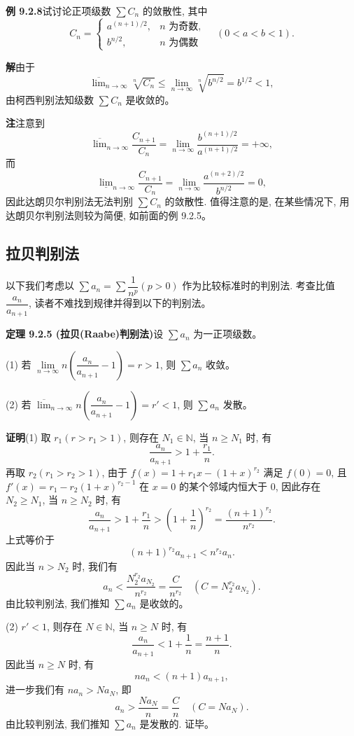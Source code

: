 \documentclass[UTF8, 12pt, fontset=fandol, oneside]{ctexart}
\begin{document}
\noindent\textbf{例 9.2.8}\quad 试讨论正项级数 $\sum C_n$ 的敛散性, 其中
\[
  C_n=\begin{cases}
    a^{(n+1)/2}, & n\text{ 为奇数},\\
    b^{n/2}, & n\text{ 为偶数}
  \end{cases}\quad(0<a<b<1).
\]

\noindent\textbf{解}\quad 由于
\[
  \overline{\lim}_{n\to\infty}\sqrt[n]{C_n}\leq\lim_{n\to\infty}\sqrt[n]{b^{n/2}}=b^{1/2}<1,
\]
由柯西判别法知级数 $\sum C_n$ 是收敛的。

\noindent\textbf{注}\quad 注意到
\[
  \overline{\lim}_{n\to\infty}\frac{C_{n+1}}{C_n}
  =\lim_{n\to\infty}\frac{b^{(n+1)/2}}{a^{(n+1)/2}}=+\infty,
\]
而
\[
  \underline{\lim}_{n\to\infty}\frac{C_{n+1}}{C_n}
  =\lim_{n\to\infty}\frac{a^{(n+2)/2}}{b^{n/2}}=0,
\]
因此达朗贝尔判别法无法判别 $\sum C_n$ 的敛散性. 值得注意的是, 在某些情况下, 用达朗贝尔判别法则较为简便, 如前面的例 9.2.5。

\subsection{拉贝判别法}

以下我们考虑以 $\sum a_n=\sum\dfrac1{n^p}(p>0)$ 作为比较标准时的判别法. 考查比值 $\dfrac{a_n}{a_{n+1}}$, 读者不难找到规律并得到以下的判别法。

\noindent\textbf{定理 9.2.5 (拉贝(Raabe)判别法)}\quad 设 $\sum a_n$ 为一正项级数。

(1) 若 $\lim\limits_{n\to\infty}n\left(\dfrac{a_n}{a_{n+1}}-1\right)=r>1$, 则 $\sum a_n$ 收敛。

(2) 若 $\overline{\lim}_{n\to\infty}n\left(\dfrac{a_n}{a_{n+1}}-1\right)=r'<1$, 则 $\sum a_n$ 发散。

\noindent\textbf{证明}\quad (1) 取 $r_1(r>r_1>1)$, 则存在 $N_1\in\mathbb{N}$, 当 $n\geq N_1$ 时, 有
\[
  \frac{a_n}{a_{n+1}}>1+\frac{r_1}{n}.
\]
再取 $r_2(r_1>r_2>1)$, 由于 $f(x)=1+r_1x-(1+x)^{r_2}$ 满足 $f(0)=0$, 且 $f'(x)=r_1-r_2(1+x)^{r_2-1}$ 在 $x=0$ 的某个邻域内恒大于 0, 因此存在 $N_2\geq N_1$, 当 $n\geq N_2$ 时, 有
\[
  \frac{a_n}{a_{n+1}}>1+\frac{r_1}{n}>\left(1+\frac1n\right)^{r_2}
  =\frac{(n+1)^{r_2}}{n^{r_2}}.
\]
上式等价于
\[
  (n+1)^{r_2}a_{n+1}<n^{r_2}a_n.
\]
因此当 $n>N_2$ 时, 我们有
\[
  a_n<\frac{N_2^{r_2}a_{N_2}}{n^{r_2}}=\frac{C}{n^{r_2}}\quad(C=N_2^{r_2}a_{N_2}).
\]
由比较判别法, 我们推知 $\sum a_n$ 是收敛的。

(2) $r'<1$, 则存在 $N\in\mathbb{N}$, 当 $n\geq N$ 时, 有
\[
  \frac{a_n}{a_{n+1}}<1+\frac1n=\frac{n+1}{n}.
\]
因此当 $n\geq N$ 时, 有
\[
  na_n<(n+1)a_{n+1},
\]
进一步我们有 $na_n>Na_N$, 即
\[
  a_n>\frac{Na_N}{n}=\frac{C}{n}\quad(C=Na_N).
\]
由比较判别法, 我们推知 $\sum a_n$ 是发散的. 证毕。
\end{document}
